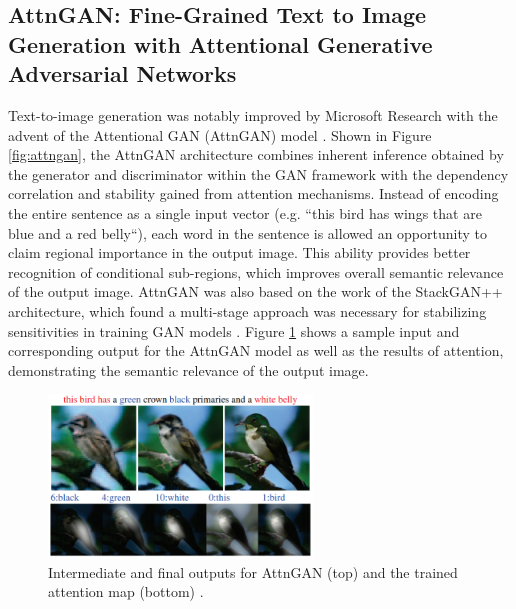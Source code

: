\documentclass[letterpaper]{article} %
\begin{document}
\subsection{AttnGAN: Fine-Grained Text to Image Generation
with Attentional Generative Adversarial Networks}
Text-to-image generation was notably improved by Microsoft Research 
with the advent of the Attentional GAN (AttnGAN) model \cite{attngan}.
Shown in Figure \ref{fig:attngan}, the AttnGAN architecture combines 
inherent inference obtained by the generator and discriminator within the GAN 
framework with the dependency correlation and stability gained from attention 
mechanisms. Instead of encoding the entire sentence as a single input 
vector (e.g. ``this bird has wings that are blue and a red belly``), each word 
in the sentence is allowed an opportunity to claim regional importance in the 
output image. This ability provides better recognition of conditional 
sub-regions, which improves overall semantic relevance of the output image.  
AttnGAN was also based on the work of the StackGAN++ architecture, which found 
a multi-stage approach was necessary for stabilizing sensitivities in training 
GAN models \cite{stackgan++}. Figure \ref{fig:attngan_sample} shows a sample 
input and corresponding output for the AttnGAN model as well as the results of 
attention, demonstrating the semantic relevance of the output image.

\begin{figure}[htbp]
\centerline{\includegraphics[width=7cm]{attngan_sample.png}}
\caption{Intermediate and final outputs for AttnGAN (top) and the trained 
attention map (bottom)
\cite{attngan}.}
\label{fig:attngan_sample}
\end{figure}
\end{document}
